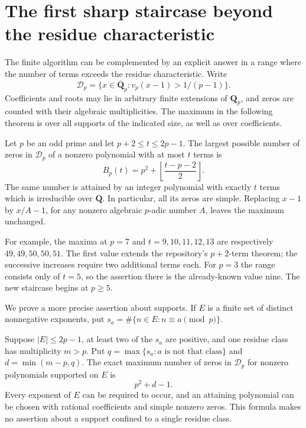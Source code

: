\section{The first sharp staircase beyond the residue characteristic}
\label{sec:sharp-range}

The finite algorithm can be complemented by an explicit answer in a range
where the number of terms exceeds the residue characteristic.  Write
\[
 \mathcal D_p=\{x\in\overline{\mathbf Q}_p:
                  v_p(x-1)>1/(p-1)\}.
\]
Coefficients and roots may lie in arbitrary finite extensions of
$\mathbf Q_p$, and zeros are counted with their algebraic multiplicities.
The maximum in the following theorem is over all supports of the indicated
size, as well as over coefficients.

\begin{theorem}\label{thm:sharp-staircase}
Let $p$ be an odd prime and let $p+2\le t\le 2p-1$.  The largest possible
number of zeros in $\mathcal D_p$ of a nonzero polynomial with at most $t$
terms is
\begin{equation}\label{eq:sharp-staircase}
 B_p(t)=p^2+\left\lfloor\frac{t-p-2}{2}\right\rfloor.
\end{equation}
The same number is attained by an integer polynomial with exactly $t$
terms which is irreducible over $\mathbf Q$.  In particular, all its zeros
are simple.  Replacing $x-1$ by $x/A-1$, for any nonzero algebraic
$p$-adic number $A$, leaves the maximum unchanged.
\end{theorem}

For example, the maxima at $p=7$ and $t=9,10,11,12,13$ are respectively
$49,49,50,50,51$.  The first value extends the repository's $p+2$-term
theorem; the successive increases require two additional terms each.
For $p=3$ the range consists only of $t=5$, so the assertion there is the
already-known value nine.  The new staircase begins at $p\ge5$.

We prove a more precise assertion about supports.  If $E$ is a finite set
of distinct nonnegative exponents, put
$s_a=\#\{n\in E:n\equiv a\pmod p\}$.

\begin{theorem}\label{thm:large-residue-class}
Suppose $|E|\le2p-1$, at least two of the $s_a$ are positive, and one
residue class has multiplicity $m>p$.  Put
$q=\max\{s_a:a\text{ is not that class}\}$ and $d=\min(m-p,q)$.
The exact maximum number of zeros in $\mathcal D_p$ for nonzero
polynomials supported on $E$ is
\begin{equation}\label{eq:large-profile}
                   p^2+d-1.
\end{equation}
Every exponent of $E$ can be required to occur, and an attaining
polynomial can be chosen with rational coefficients and simple nonzero
zeros.  This formula makes no assertion about a support confined to a
single residue class.
\end{theorem}

